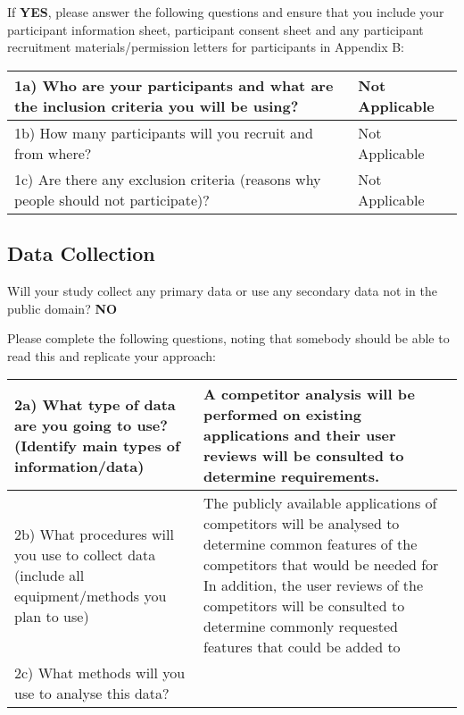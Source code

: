 \documentclass[../CHEFCookingHelperForEveryonesFridge.tex]{subfiles}
\begin{document}
If \textbf{YES}, please answer the following questions and ensure that you include your participant
information sheet, participant consent sheet and any participant recruitment materials/permission
letters for participants in Appendix B:

\begin{table}[H]
    \begin{tabulary}{\textwidth}{|L|L|}
        \hline
        1a) Who are your participants and what are the inclusion criteria you will be using? & Not Applicable \\\hline
        1b) How many participants will you recruit and from where? & Not Applicable \\\hline
        1c) Are there any exclusion criteria (reasons why people should not participate)? & Not Applicable \\\hline
    \end{tabulary}
\end{table}

\subsection{Data Collection}
Will your study collect any primary data or use any secondary data not in the public domain? \textbf{NO}

Please complete the following questions, noting that somebody should be able to read this and replicate your approach:

\begin{table}[H]
    \begin{tabulary}{\textwidth}{|L|L|}
        \hline
        2a) What type of data are you going to use? (Identify main types of information/data)
            &
        A competitor analysis will be performed on existing applications and their user reviews will be consulted to determine requirements.
            \\\hline
        2b) What procedures will you use to collect data (include all equipment/methods you plan to use)
            &
        The publicly available applications of competitors will be analysed to determine common features of the competitors that would be needed for \chef{}
        In addition, the user reviews of the competitors will be consulted to determine commonly requested features that could be added to \chef{}
            \\\hline
        2c) What methods will you use to analyse this data?
            &

            \\\hline
    \end{tabulary}
\end{table}
\end{document}
